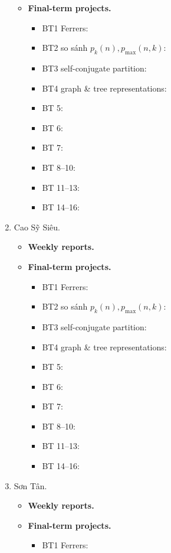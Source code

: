 \documentclass{article}
\begin{document}
\begin{enumerate}
\begin{itemize}
        \item {\bf Final-term projects.}
        \begin{itemize}
            \item BT1 Ferrers:
            \item BT2 so sánh $p_k(n),p_{\max}(n,k)$:
            \item BT3 self-conjugate partition:
            \item BT4 graph \& tree representations:
            \item BT 5:
            \item BT 6:
            \item BT 7:
            \item BT 8--10:
            \item BT 11--13:
            \item BT 14--16:
        \end{itemize}
    \end{itemize}
    \item {\sc Cao Sỹ Siêu.}
    \begin{itemize}
        \item {\bf Weekly reports.}
        \item {\bf Final-term projects.}
        \begin{itemize}
            \item BT1 Ferrers:
            \item BT2 so sánh $p_k(n),p_{\max}(n,k)$:
            \item BT3 self-conjugate partition:
            \item BT4 graph \& tree representations:
            \item BT 5:
            \item BT 6:
            \item BT 7:
            \item BT 8--10:
            \item BT 11--13:
            \item BT 14--16:
        \end{itemize}
    \end{itemize}
    \item {\sc Sơn Tân.}
    \begin{itemize}
        \item {\bf Weekly reports.}
        \item {\bf Final-term projects.}
        \begin{itemize}
            \item BT1 Ferrers:

\end{itemize}
\end{itemize}
\end{enumerate}
\end{document}
